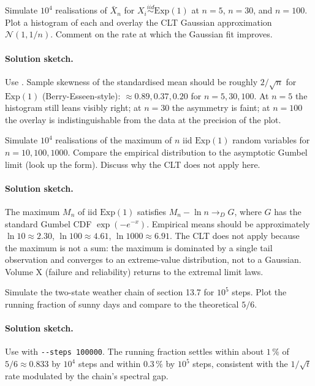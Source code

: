 \begin{exercise}
Simulate $10^{4}$ realisations of $\bar X_{n}$ for $X_{i}
\stackrel{iid}{\sim} \mathrm{Exp}(1)$ at $n = 5$, $n = 30$, and
$n = 100$. Plot a histogram of each and overlay the CLT Gaussian
approximation $\mathcal{N}(1, 1/n)$. Comment on the rate at which
the Gaussian fit improves.
\end{exercise}

\paragraph{Solution sketch.}
Use .
Sample skewness of the standardised mean should be roughly $2/
\sqrt{n}$ for $\mathrm{Exp}(1)$ (Berry-Esseen-style): $\approx
0.89, 0.37, 0.20$ for $n = 5, 30, 100$. At $n = 5$ the histogram
still leans visibly right; at $n = 30$ the asymmetry is faint; at
$n = 100$ the overlay is indistinguishable from the data at the
precision of the plot.

\begin{exercise}
Simulate $10^{4}$ realisations of the maximum of $n$ iid
$\mathrm{Exp}(1)$ random variables for $n = 10, 100, 1000$. Compare
the empirical distribution to the asymptotic Gumbel limit (look up
the form). Discuss why the CLT does not apply here.
\end{exercise}

\paragraph{Solution sketch.}
The maximum $M_{n}$ of iid $\mathrm{Exp}(1)$ satisfies $M_{n} -
\ln n \to_{D} G$, where $G$ has the standard Gumbel CDF $\exp(-
e^{-x})$. Empirical means should be approximately $\ln 10 \approx
2.30$, $\ln 100 \approx 4.61$, $\ln 1000 \approx 6.91$. The CLT
does not apply because the maximum is not a sum: the maximum is
dominated by a single tail observation and converges to an
extreme-value distribution, not to a Gaussian. Volume X (failure
and reliability) returns to the extremal limit laws.

\begin{exercise}
Simulate the two-state weather chain of section 13.7 for $10^{5}$
steps. Plot the running fraction of sunny days and compare to the
theoretical $5/6$.
\end{exercise}

\paragraph{Solution sketch.}
Use 
with \texttt{-{}-steps 100000}. The running fraction settles within
about $1\,\%$ of $5/6 \approx 0.833$ by $10^{4}$ steps and within
$0.3\,\%$ by $10^{5}$ steps, consistent with the $1/\sqrt{t}$ rate
modulated by the chain's spectral gap.

